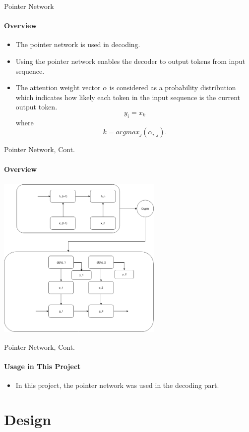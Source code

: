 \documentclass{beamer}
\begin{document}
\begin{frame}{Pointer Network}\framesubtitle{Overview}
    \begin{itemize}
        \item The pointer network is used in decoding.
        \item Using the pointer network enables the decoder to output tokens from input sequence.
        \item The attention weight vector $\alpha$ is considered as a probability distribution which indicates how likely each token in the input sequence is the current output token.
        $$y_i = x_k$$
        where
        $$k = argmax_j(\alpha _{i,j}).$$
    \end{itemize}
\end{frame}

\begin{frame}{Pointer Network, Cont.}\framesubtitle{Overview}
    \begin{center}
        \includegraphics[width=8cm, height=8cm]{figures/pointerNetwork.png}
    \end{center}

\end{frame}

\begin{frame}{Pointer Network, Cont.}\framesubtitle{Usage in This Project}
    \begin{itemize}
        \item In this project, the pointer network was used in the decoding part.
    \end{itemize}

\end{frame}

\section{Design}
\end{document}
